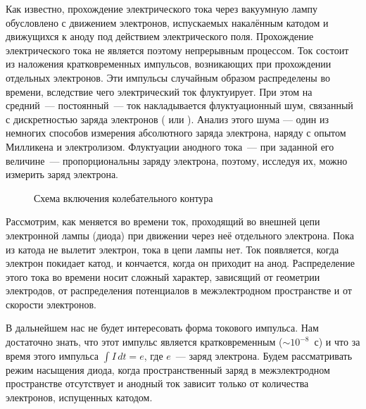 


Как известно, прохождение электрического тока через вакуумную лампу
обусловлено с движением электронов, испускаемых
накалённым катодом и движущихся к аноду под действием электрического поля.
Прохождение электрического тока не является
поэтому непрерывным процессом. Ток состоит из наложения кратковременных
импульсов, возникающих при прохождении отдельных
электронов. Эти импульсы случайным образом распределены во времени, вследствие
чего электрический ток флуктуирует. При этом на средний~--- постоянный~--- 
ток накладывается флуктуационный шум, связанный с дискретностью заряда электронов
( или ). 
Анализ этого шума --- один из немногих способов измерения абсолютного заряда электрона, 
наряду с опытом Милликена и электролизом.
Флуктуации анодного тока~--- при заданной его
величине~--- пропорциональны заряду электрона, поэтому, исследуя их, можно
измерить заряд электрона.

\begin{figure}[h!]
    \centering
	\caption{Схема включения колебательного контура}
\end{figure}

Рассмотрим, как меняется во времени ток, проходящий во внешней цепи электронной
лампы (диода) при движении через неё
отдельного электрона. Пока из катода не вылетит электрон, тока в цепи лампы нет.
Ток появляется, когда электрон покидает
катод, и кончается, когда он приходит на анод. Распределение этого тока во
времени носит сложный характер, зависящий от
геометрии электродов, от распределения потенциалов в межэлектродном пространстве
и от скорости электронов.

В дальнейшем нас не будет интересовать форма токового импульса. Нам достаточно
знать, что этот импульс является кратковременным (${\sim}10^{-8}$~с) 
и что за время этого импульса $\int I\,dt=e$, где $e$~--- заряд электрона. 
Будем рассматривать режим насыщения диода, когда пространственный заряд в
межэлектродном пространстве отсутствует и анодный
ток зависит только от количества электронов, испущенных катодом.

